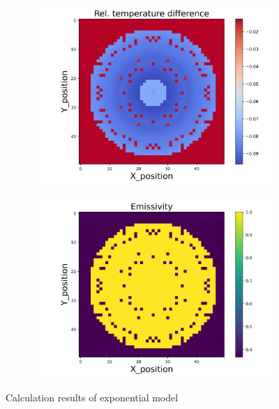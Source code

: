 \begin{figure}[htbp]
    \begin{minipage}{\textwidth}
        \centering
        \begin{subfigure}{0.49\textwidth}
            \centering
            \includegraphics[width=\textwidth]{figures/raw_data/5/exp/T_bias.jpg}
        \end{subfigure}
        \begin{subfigure}{0.49\textwidth}
            \centering
            \includegraphics[width=\textwidth]{figures/raw_data/5/exp/emi_cal.jpg}
        \end{subfigure}
    \end{minipage}
    \caption{Calculation results of exponential model}
    \label{fig: result_exponential_model}
\end{figure}


